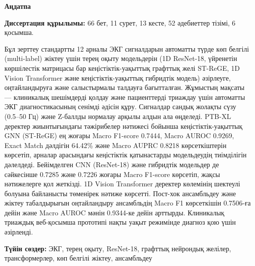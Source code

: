 \documentclass[12pt,a4paper]{article}
\begin{document}
\begin{otherlanguage}{kazakh}
\begin{center}
    \large\textbf{Аңдатпа}
\end{center}
\vspace{0.3cm}

\noindent \textbf{Диссертация құрылымы:} 66 бет, 11 сурет, 13 кесте, 52 әдебиеттер тізімі, 6 қосымша.
\vspace{0.3cm}

Бұл зерттеу стандартты 12 арналы ЭКГ сигналдарын автоматты түрде көп белгілі (multi-label) жіктеу үшін терең оқыту модельдерін (1D ResNet-18, үйренетін көршілестік матрицасы бар кеңістіктік-уақыттық графттық желі ST-ReGE, 1D Vision Transformer және кеңістіктік-уақыттық гибридтік модель) әзірлеуге, оңтайландыруға және салыстырмалы талдауға бағытталған. Жұмыстың мақсаты — клиникалық шешімдерді қолдау және пациенттерді триаждау үшін автоматты ЭКГ диагностикасының сенімді әдісін құру. Сигналдар сандық жолақты сүзу (0.5--50 Гц) және Z-баллды нормалау арқылы алдын ала өңделеді. PTB-XL деректер жиынтығындағы тәжірибелер нәтижесі бойынша кеңістіктік-уақыттық GNN (ST-ReGE) ең жоғары Macro F1-score 0.7444, Macro AUROC 0.9269, Exact Match дәлдігін 64.42\% және Macro AUPRC 0.8218 көрсеткіштерін көрсетіп, арналар арасындағы кеңістіктік қатынастарды модельдеудің тиімділігін дәлелдеді. Бейімделген CNN (ResNet-18) және гибридтік модельдер де сәйкесінше 0.7285 және 0.7226 жоғары Macro F1-score көрсетіп, жақсы нәтижелерге қол жеткізді. 1D Vision Transformer деректер көлемінің шектеулі болуына байланысты төменірек нәтиже көрсетті. Пост-хок ансамбльдеу және жіктеу табалдырығын оңтайландыру ансамбльдің Macro F1 көрсеткішін 0.7506-ға дейін және Macro AUROC мәнін 0.9344-ке дейін арттырды. Клиникалық триаждық веб-қосымша прототипі нақты уақыт режимінде диагноз қою үшін әзірленді.

\vspace{0.8cm}
\noindent\textbf{Түйін сөздер:} ЭКГ, терең оқыту, ResNet-18, графттық нейрондық желілер, трансформерлер, көп белгілі жіктеу, ансамбльдеу
\end{otherlanguage}
\end{document}
